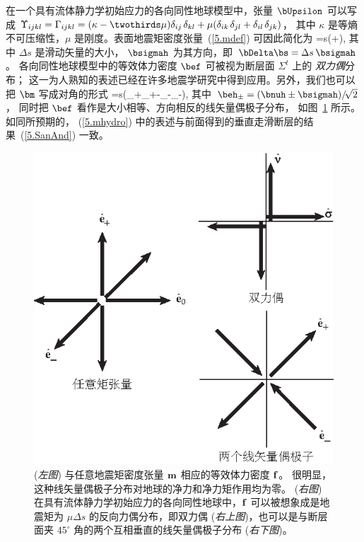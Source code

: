 在一个具有流体静力学初始应力的各向同性地球模型中，张量 $\bUpsilon$ 可以写成 
$\Upsilon_{ijkl}=\Gamma_{ijkl}=(\kappa-\twothirds\mu)
\delta_{ij\,}\delta_{kl}+\mu(\delta_{ik\,}\delta_{jl}
+\delta_{il\,}\delta_{jk})$，
其中 $\kappa$ 是等熵不可压缩性，$\mu$ 是刚度。表面地震矩密度张量~(\ref{5.mdef}) 可因此简化为
\eq
\label{5.mhydro}
\bm=\mu\Delta s(\bnuh\bsigmah+\bsigmah\bnuh),
\en
其中 $\Delta s$ 是滑动矢量的大小， $\bsigmah$
为其方向，即 $\bDelta\bs=\Delta s_{\,}\bsigmah$。
各向同性地球模型中的等效体力密度 $\bef$ 可被视为断层面 $\Sigma^t$ 上的
{\em 双力偶\/}分布；
%
%
这一为人熟知的表述已经在许多地震学研究中得到应用。另外，我们也可以把 $\bm$ 写成对角的形式
\eq
\bm=\mu\Delta s(\beh_+\beh_+-\beh_-\beh_-),
\en
其中 $\beh_{\pm}=(\bnuh\pm\bsigmah)/\!\sqrt{2}$，
同时把 $\bef$ 看作是大小相等、方向相反的线矢量偶极子分布，
如图~\ref{fig5.5} 所示。如同所预期的，
(\ref{5.mhydro}) 中的表述与前面得到的垂直走滑断层的结果~(\ref{5.SanAnd}) 一致。
\begin{figure}[!t]
\begin{center}
\includegraphics{../figures/chap05/fig05.eps}
\end{center}
\caption[equivforces]{\label{fig5.5}
({\em 左图}) 与任意地震矩密度张量 ${\bf m}$ 相应的等效体力密度 ${\bf f}$。 很明显，这种线矢量偶极子分布对地球的净力和净力矩作用均为零。
%
({\em 右图}) 在具有流体静力学初始应力的各向同性地球中，${\bf f}$ 可以被想象成是地震矩为
$\mu\Delta s$ 的反向力偶分布，即双力偶
({\em 右上图\/})，也可以是与断层面夹 $45^{\circ}$ 角的两个互相垂直的线矢量偶极子分布 ({\em 右下图\/})。}
\end{figure}

